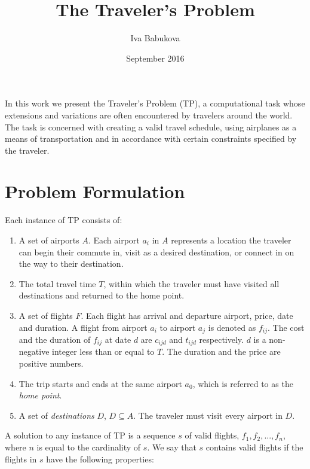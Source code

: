 \documentclass{article}
\title{The Traveler's Problem}
\author{Iva Babukova}
\date{September 2016}
\theoremstyle{definition}
\begin{document}
\maketitle

In this work we present the Traveler's Problem (TP), a computational task whose extensions and variations are often encountered by travelers around the world. The task is concerned with creating a valid travel schedule, using airplanes as a means of transportation and in accordance with certain constraints specified by the traveler.

\section{Problem Formulation}
Each instance of TP consists of:

\begin{enumerate}
\item A set of airports $A$. Each airport $a_{i}$ in $A$ represents a location the traveler can begin their commute in, visit as a desired destination, or connect in on the way to their destination.
\item The total travel time $T$, within which the traveler must have visited all destinations and returned to the home point.
\item A set of flights $F$. Each flight has arrival and departure airport, price, date and duration. A flight from airport $a_{i}$ to airport $a_{j}$ is denoted as $f_{ij}$. The cost and the duration of $f_{ij}$ at date $d$ are $c_{ijd}$ and $t_{ijd}$ respectively. $d$ is a non-negative integer less than or equal to $T$. The duration and the price are positive numbers.
\item The trip starts and ends at the same airport $a_{0}$, which is referred to as the \textit{home point}.
\item A set of \textit{destinations} $D$, $D \subseteq A$. The traveler must visit every airport in $D$.
\end{enumerate}

A solution to any instance of TP is a sequence $s$ of valid flights, ${f_{1}, f_{2}, ..., f_{n}}$, where $n$ is equal to the cardinality of $s$. We say that $s$ contains valid flights if the flights in $s$ have the following properties:
\end{document}
